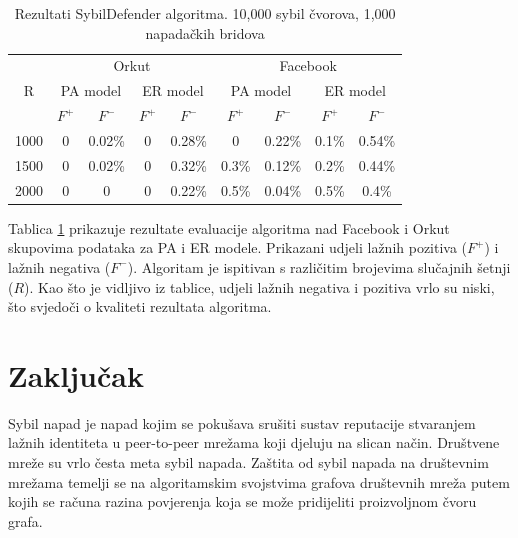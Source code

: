 \documentclass[times, utf8, seminar, numeric]{fer}
\begin{document}
\begin{table}[!h]
	\centering
	\caption{Rezultati SybilDefender algoritma. 10,000 sybil čvorova, 1,000 napadačkih bridova}
	\label{tbl:results}
	
	\begin{tabular}{|c|c|c|c|c|c|c|c|c|} \hline
    \multirow{3}{*}{R} & \multicolumn{4}{c|}{Orkut} & \multicolumn{4}{c|}{Facebook} \\
    & \multicolumn{2}{c}{PA model} & \multicolumn{2}{c|}{ER model} & \multicolumn{2}{c}{PA model} & \multicolumn{2}{c|}{ER model} \\
    & \multicolumn{1}{c}{$F^+$} & \multicolumn{1}{c}{$F^-$} & \multicolumn{1}{c}{$F^+$} & \multicolumn{1}{c|}{$F^-$} & \multicolumn{1}{c}{$F^+$} & \multicolumn{1}{c}{$F^-$} & \multicolumn{1}{c}{$F^+$} & \multicolumn{1}{c|}{$F^-$} \\ \hline
    1000 & 0 & 0.02\% & 0 & 0.28\% & 0 & 0.22\% & 0.1\% & 0.54\% \\
    1500 & 0 & 0.02\% & 0 & 0.32\% & 0.3\% & 0.12\% & 0.2\% & 0.44\% \\
    2000 & 0 & 0 & 0 & 0.22\% & 0.5\% & 0.04\% & 0.5\% & 0.4\% \\
		\hline
	\end{tabular}
\end{table}

Tablica \ref{tbl:results} prikazuje rezultate evaluacije algoritma nad Facebook i Orkut skupovima podataka za PA i ER modele. Prikazani udjeli lažnih pozitiva ($F^+$) i lažnih negativa ($F^-$). Algoritam je ispitivan s različitim brojevima slučajnih šetnji ($R$). Kao što je vidljivo iz tablice, udjeli lažnih negativa i pozitiva vrlo su niski, što svjedoči o kvaliteti rezultata algoritma.

\chapter{Zaključak} \label{ch:conclusion}




\begin{sazetak}
  Sybil napad je napad kojim se pokušava srušiti sustav reputacije stvaranjem lažnih identiteta u peer-to-peer mrežama koji djeluju na slican način. Društvene mreže su vrlo česta meta sybil napada. Zaštita od sybil napada na društevnim mrežama temelji se na algoritamskim svojstvima grafova društevnih mreža putem kojih se računa razina povjerenja koja se može pridijeliti proizvoljnom čvoru grafa.

\end{sazetak}
\end{document}
